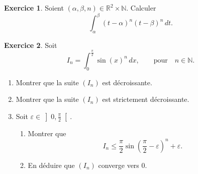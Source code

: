 \documentclass[a4paper, 11pt,openany]{article}%
\theoremstyle{plain}
\theoremstyle{definition}
\newtheorem{exo}{Exercice}
\newtheorem{sol}{Solution de l'exercice}
\theoremstyle{remark}
\newcommand{\R}{\mathbb{R}}
\newcommand{\N}{\mathbb{N}}
\begin{document}
\begin{exo}
Soient $(\alpha, \beta, n) \in \R^2 \times \N$. Calculer 
\[ \int_{\alpha}^{\beta} (t-\alpha)^n (t - \beta)^n \, dt.\]
\end{exo}

   




\begin{exo}
Soit 
\[ I_n= \int_0^{\frac{\pi}{2}} \sin(x)^n \, dx, \quad \quad \text{pour} \quad n\in \N.\]
\begin{enumerate}
\item Montrer que la suite $(I_n)$ est décroissante.
\item Montrer que la suite $(I_n)$ est strictement décroissante.
\item Soit $\varepsilon \in \left] 0 ,\frac{\pi}{2} \right[$. \begin{enumerate}
\item  Montrer que 
\[ I_n \leqslant \frac{\pi}{2} \sin \left( \frac{\pi}{2} - \varepsilon \right)^n + \varepsilon.\]
\item En déduire que $(I_n)$ converge vers $0$.
\end{enumerate}
\end{enumerate}
\end{exo}
\end{document}
